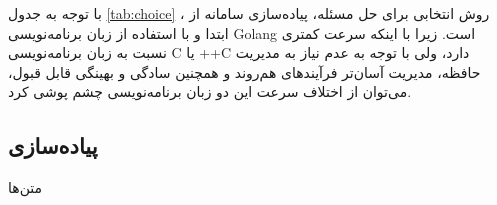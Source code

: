 با توجه به جدول
\ref{tab:choice}
، روش انتخابی برای حل مسئله،‌ پیاده‌سازی سامانه از ابتدا و با استفاده از زبان برنامه‌نویسی Golang است. زیرا با اینکه سرعت کمتری نسبت به زبان برنامه‌نویسی C یا ++C دارد، ولی با توجه به عدم نیاز به مدیریت حافظه، مدیریت آسان‌تر فرآیند‌های هم‌روند و همچنین سادگی و بهینگی قابل قبول،‌ می‌توان از اختلاف سرعت این دو زبان برنامه‌نویسی چشم پوشی کرد.

\subsection{پیاده‌سازی}\label{subsec:impl_impl}
متن‌ها


\cleardoublepage 